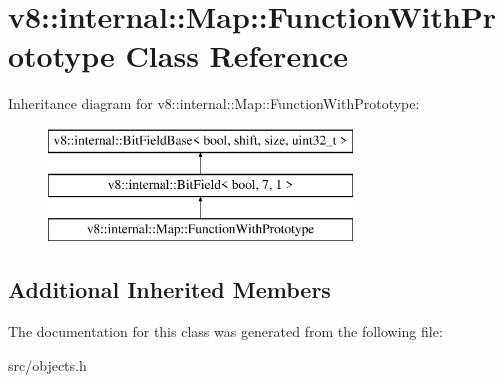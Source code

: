 \hypertarget{classv8_1_1internal_1_1_map_1_1_function_with_prototype}{}\section{v8\+:\+:internal\+:\+:Map\+:\+:Function\+With\+Prototype Class Reference}
\label{classv8_1_1internal_1_1_map_1_1_function_with_prototype}
Inheritance diagram for v8\+:\+:internal\+:\+:Map\+:\+:Function\+With\+Prototype\+:\begin{figure}[H]
\begin{center}
\leavevmode
\includegraphics[height=3.000000cm]{classv8_1_1internal_1_1_map_1_1_function_with_prototype}
\end{center}
\end{figure}
\subsection*{Additional Inherited Members}


The documentation for this class was generated from the following file\+:\begin{DoxyCompactItemize}
\item 
src/objects.\+h\end{DoxyCompactItemize}
